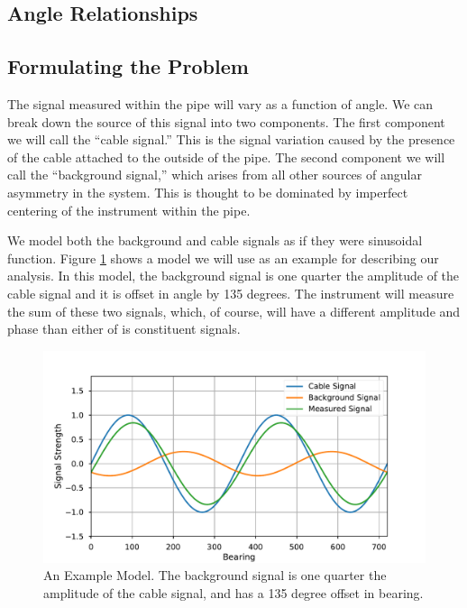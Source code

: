 \documentclass[paper=a4, fontsize=11pt]{scrartcl}
\numberwithin{equation}{section}		%
\numberwithin{figure}{section}			%
\numberwithin{table}{section}				%
\begin{document}
\begin{appendices}
\section{Angle Relationships}
\subsection{Formulating the Problem}
The signal measured within the pipe will vary as a function of angle.  We can break down the source of this signal into two components.  The first component we will call the ``cable signal.''  This is the signal variation caused by the presence of the cable attached to the outside of the pipe.  The second component we will call the ``background signal,'' which arises from all other sources of angular asymmetry in the system.  This is thought to be dominated by imperfect centering of the instrument within the pipe.

\par We model both the background and cable signals as if they were sinusoidal function.  Figure \ref{fig:sigs_vs_bearing} shows a model we will use as an example for describing our analysis.  In this model, the background signal is one quarter the amplitude of the cable signal and it is offset in angle by 135 degrees.  The instrument will measure the sum of these two signals, which, of course, will have a different amplitude and phase than either of is constituent signals.

\begin{figure}[h!]
  \caption{An Example Model.  The background signal is one quarter the amplitude of the cable signal, and has a 135 degree offset in bearing.}
  \label{fig:sigs_vs_bearing}
  \centering
  \includegraphics[width=1.0\textwidth]{figures/sigs_vs_bearing.pdf}
\end{figure}


\end{appendices}
\end{document}
